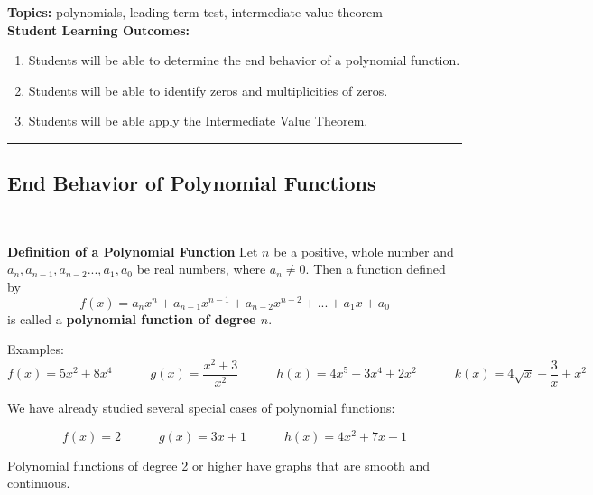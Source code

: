 
\noindent \textbf{Topics:}  polynomials, leading term test, intermediate value theorem\\

\noindent \textbf{Student Learning Outcomes:}
\begin{enumerate}
\item Students will be able to determine the end behavior of a polynomial function.
\item Students will be able to identify zeros and multiplicities of zeros.
\item Students will be able apply the Intermediate Value Theorem.

\end{enumerate}

\hrule 

\bigskip

\subsection{End Behavior of Polynomial Functions} ~

\begin{boxthm}
{\bf Definition of a Polynomial Function}
Let $n$ be a positive, whole number and $a_n,a_{n-1}, a_{n-2}...,a_1,a_0$ be real numbers, where $a_n\neq 0$.  Then a function defined by $$f(x)=a_nx^n+a_{n-1}x^{n-1}+a_{n-2}x^{n-2}+...+a_1x+a_0$$ is called a \textbf{polynomial function of degree $n$}.

\end{boxthm}


Examples:
$$f(x)=5x^2+8x^4 \quad \quad \quad g(x)=\frac{x^2+3}{x^2} \quad \quad \quad  h(x)=4x^5-3x^4+2x^2 \quad \quad \quad k(x)=4\sqrt{x}-\frac{3}{x} +x^2$$

\vfill
We have already studied several special cases of polynomial functions:

$$f(x)=2 \quad \quad \quad g(x)=3x+1 \quad \quad \quad  h(x)=4x^2+7x-1$$


\vfill

Polynomial functions of degree 2 or higher have graphs that are smooth and continuous.\\[.5in]


\newpage

